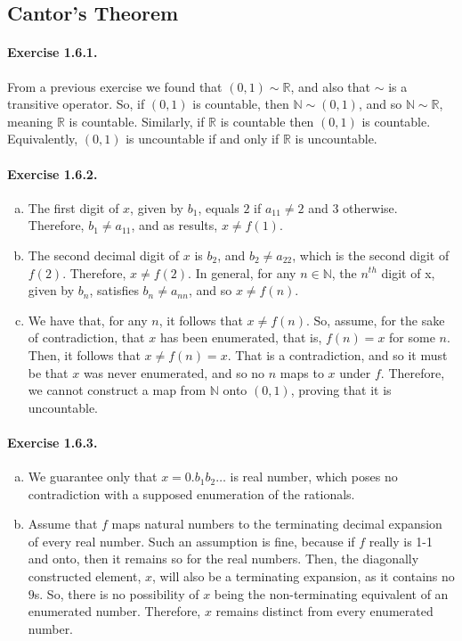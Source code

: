 \documentclass{article}
\newcommand{\N}{\mathbb{N}}
\newcommand{\R}{\mathbb{R}}
\begin{document}
\subsection{Cantor's Theorem}
\paragraph{Exercise 1.6.1.}
From a previous exercise we found that $(0,1) \sim \R$, and also that $\sim$ is a transitive operator. So, if $(0,1)$ is countable, then $\N \sim (0,1)$, and so $\N \sim \R$, meaning $\R$ is countable. Similarly, if $\R$ is countable then $(0,1)$ is countable. Equivalently, $(0,1)$ is uncountable if and only if $\R$ is uncountable.

\paragraph{Exercise 1.6.2.}
\begin{enumerate}[(a)]
    \item 
	The first digit of $x$, given by $b_1$, equals $2$ if $a_{11} \neq 2$ and $3$ otherwise. 
	Therefore, $b_1\neq a_{11}$, and as results, $x \neq f(1)$.

    \item 
	The second decimal digit of $x$ is $b_2$, and $b_2\neq a_{22}$, which is the second digit of $f(2)$. 
	Therefore, $x\neq f(2)$. 
	In general, for any $n\in \N$, the $n^{th}$ digit of x, given by $b_n$, satisfies $b_n\neq a_{nn}$, and so $x\neq f(n)$. 

    \item 
	We have that, for any $n$, it follows that $x \neq f(n)$.
	So, assume, for the sake of contradiction, that $x$ has been enumerated, that is, $f(n) = x$ for some $n$.
	Then, it follows that $x \neq f(n) = x$.
	That is a contradiction, and so it must be that $x$ was never enumerated, and so no $n$ maps to $x$ under $f$.
	Therefore, we cannot construct a map from $\N$ onto $(0,1)$, proving that it is uncountable.
\end{enumerate}

\paragraph{Exercise 1.6.3.}
\begin{enumerate}[(a)]
    \item 
	We guarantee only that $x=0.b_1b_2\ldots$ is real number, which poses no contradiction with a supposed enumeration of the rationals.

    \item 
	Assume that $f$ maps natural numbers to the terminating decimal expansion of every real number.
	Such an assumption is fine, because if $f$ really is 1-1 and onto, then it remains so for the real numbers.
	Then, the diagonally constructed element, $x$, will also be a terminating expansion, as it contains no $9$s.
	So, there is no possibility of $x$ being the non-terminating equivalent of an enumerated number.
	Therefore, $x$ remains distinct from every enumerated number.
\end{enumerate}
\end{document}
